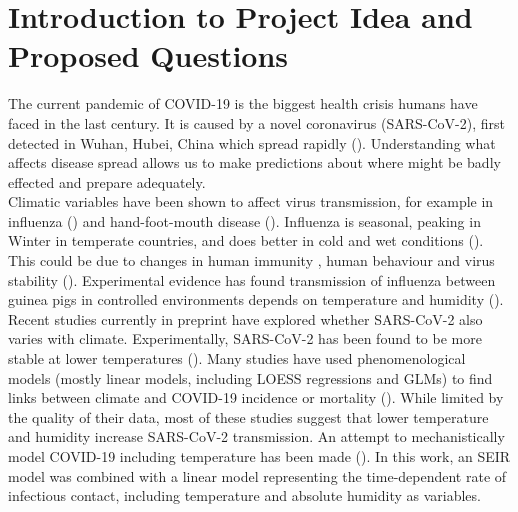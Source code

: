 \documentclass[11pt]{article}
\begin{document}
\section{Introduction to Project Idea and Proposed Questions}
The current  pandemic of COVID-19 is the biggest health crisis humans have faced in the last century. It is caused by a novel coronavirus (SARS-CoV-2), first detected in Wuhan, Hubei, China which spread rapidly (\cite{WorldHealthOrganizationWHO2020Novel1}). Understanding what affects disease spread allows us to make predictions about where might be badly effected and prepare adequately.  \\
Climatic variables have been shown to affect virus transmission, for example in influenza (\cite{Lofgren2007InfluenzaTheories}) and hand-foot-mouth disease (\cite{Feng2014TimePredictors}). Influenza is seasonal, peaking in Winter in temperate countries, and does better in cold and wet conditions (\cite{Deyle2016GlobalInfluenza}).
This could be due to changes in human immunity%
, human behaviour %
 and virus stability (\cite{Lipsitch2009InfluenzaFog}).%
  Experimental evidence has found transmission of influenza between guinea pigs in controlled environments depends on temperature and humidity (\cite{Lowen2007InfluenzaTemperature}). 
\\
Recent studies currently in preprint have explored whether SARS-CoV-2 also varies with climate. Experimentally,  SARS-CoV-2 has been found to be more stable at lower temperatures (\cite{Chin2020StabilityConditions}). 
Many studies have used phenomenological models (mostly linear models, including LOESS regressions and GLMs) to find links between climate and COVID-19 incidence or mortality (\cite{Wang2020HighCOVID-19,Luo2020TheOutbreak,Sajadi2020TemperatureCOVID-19,Bannister-Tyrrell2020Preliminary2020,Rahman2020AOutbreak,Oliveiros2020RoleCases,Chen2020RolesScale,Ma2020EffectsWuhan,Poirier2020TheScales.}).  While limited by the quality of their data, most of these studies suggest that lower temperature and humidity increase SARS-CoV-2 transmission. An attempt to mechanistically model COVID-19 including temperature has been made (\cite{Shi2020TheChina}). In this work, an SEIR model was combined with a linear model representing the time-dependent rate of infectious contact, including temperature and absolute humidity as variables.
\end{document}
